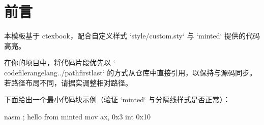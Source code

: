 \chapter{前言}

本模板基于 ctexbook，配合自定义样式 `style/custom.sty` 与 `minted` 提供的代码高亮。

\begin{notebox}
在你的项目中，将代码片段优先以 `\\codefilerange{lang}{../path}{first}{last}` 的方式从仓库中直接引用，以保持与源码同步。若路径布局不同，请据实调整相对路径。
\end{notebox}

下面给出一个最小代码块示例（验证 `minted` 与分隔线样式是否正常）：

\begin{codeblock}{nasm}
; hello from minted
mov ax, 0x3
int 0x10
\end{codeblock}

